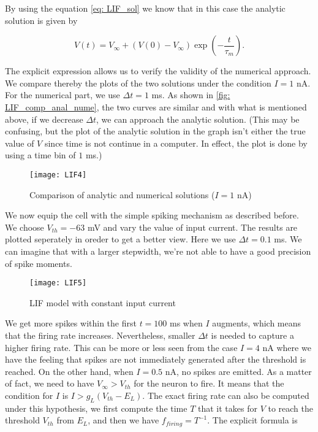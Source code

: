 By using the equation \eqref{eq: LIF_sol} we know that in this case the
analytic solution is given by

\begin{equation}
  \label{eq: LIF_cst_sol}
  V(t) = V_{\infty} + (V(0) - V_{\infty})\exp(-\frac{t}{\tau_m}).
\end{equation}

\noindent
The explicit expression allows us to verify the validity of the numerical
approach. We compare thereby the plots of the two solutions under the condition
$I = 1$ nA. For the numerical part, we use $\Delta t = 1$ ms. As shown in
\autoref{fig: LIF_comp_anal_nume}, the two curves are similar and with what is
mentioned above, if we decrease $\Delta t$, we can approach the analytic
solution. (This may be confusing, but the plot of the analytic solution in the
graph isn't either the true value of $V$ since time is not continue in a
computer. In effect, the plot is done by using a time bin of $1$ ms.)

\vspace{-1em}
\begin{figure}[H]
  \centering
  \texttt{[image: LIF4]}
  \caption{Comparison of analytic and numerical solutions ($I = 1$ nA)}
  \label{fig: LIF_comp_anal_nume}
\end{figure}

We now equip the cell with the simple spiking mechanism as described before.
We choose $V_{th} = -63$ mV and vary the value of input current. The results
are plotted seperately in oreder to get a better view. Here we use 
$\Delta t = 0.1$ ms. We can imagine that with a larger stepwidth, we're not
able to have a good precision of spike moments.

\vspace{-1em}
\begin{figure}[H]
  \centering
  \texttt{[image: LIF5]}
  \caption{LIF model with constant input current}
\end{figure}

We get more spikes within the first $t = 100$ ms when $I$ augments, which
means that the firing rate increases. Nevertheless, smaller $\Delta t$ is
needed to capture a higher firing rate. This can be more or less seen from the
case $I = 4$ nA where we have the feeling that spikes are not immediately
generated after the threshold is reached. On the other hand, when $I = 0.5$ nA,
no spikes are emitted. As a matter of fact, we need to have 
$V_{\infty} > V_{th}$ for the neuron to fire. It means that the condition for
$I$ is $I > g_L(V_{th}-E_L)$. The exact firing rate can also be computed under
this hypothesis, we first compute the time $T$ that it takes for $V$ to reach 
the threshold $V_{th}$ from $E_L$, and then we have $f_{firing} = T^{-1}$. 
The explicit formula is

